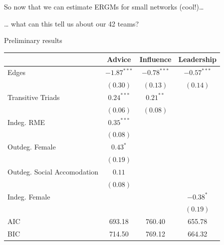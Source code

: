 \documentclass[10pt,ignorenonframetext,aspectratio=169,]{beamer}
\begin{document}
\begin{frame}

\large So now that we can estimate ERGMs for small networks
(cool!)\ldots{}\pause{}

\hspace{2cm}

\ldots{} what can this tell us about our 42 teams?

\end{frame}

\begin{frame}{Preliminary results}
\protect\hypertarget{preliminary-results}{}

\scriptsize

\begin{table}
\begin{center}
\begin{tabular}{l c c c }
\hline
 & Advice & Influence & Leadership \\
\hline
Edges                       & $-1.87^{***}$ & $-0.78^{***}$ & $-0.57^{***}$ \\
                            & $(0.30)$      & $(0.13)$      & $(0.14)$      \\
Transitive Triads           & $0.24^{***}$  & $0.21^{**}$   &               \\
                            & $(0.06)$      & $(0.08)$      &               \\
Indeg. RME                  & $0.35^{***}$  &               &               \\
                            & $(0.08)$      &               &               \\
Outdeg. Female              & $0.43^{*}$    &               &               \\
                            & $(0.19)$      &               &               \\
Outdeg. Social Accomodation & $0.11$        &               &               \\
                            & $(0.08)$      &               &               \\
Indeg. Female               &               &               & $-0.38^{*}$   \\
                            &               &               & $(0.19)$      \\
\hline
AIC                         & 693.18        & 760.40        & 655.78        \\
BIC                         & 714.50        & 769.12        & 664.32        \\

\end{tabular}
\end{center}
\end{table}
\end{frame}
\end{document}
